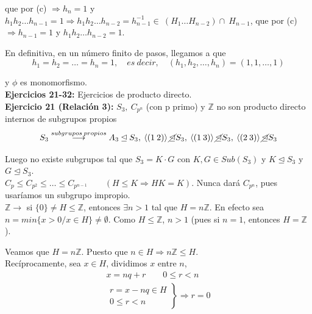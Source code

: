 \documentclass{article}
\begin{document}
que por (c) $\Rightarrow h_n=1$ y $h_1h_2\ldots h_{n-1}=1\Rightarrow h_1h_2\ldots h_{n-2}=h_{n-1}^{-1}\in~(H_1\ldots H_{n-2})\cap~H_{n-1}$, que por (c) $\Rightarrow h_{n-1}=1$ y $h_1h_2\ldots h_{n-2}=1$. 

En definitiva, en un número finito de pasos, llegamos a que 
\begin{equation*}
h_1=h_2=\ldots=h_n=1,\quad es\:decir,\quad(h_1,h_2,\ldots,h_n)=(1,1,\ldots,1)
\end{equation*}

y $\phi$ es monomorfismo. \\

\textbf{Ejercicios 21-32:} Ejercicios de producto directo. \\

\textbf{Ejercicio 21 (Relación 3):} $S_3,\:C_{p^n}$ (con p primo) y $\mathbb{Z}$ no son producto directo internos de subgrupos propios
\begin{equation*}
S_3\overset{subgrupos\:propios}{\longrightarrow} A_3\unlhd S_3,\:\left\langle (1\:2)\right\rangle \cancel{\unlhd}S_3,\:\left\langle(1\:3)\right\rangle \cancel{\unlhd} S_3,\:\left\langle (2\:3)\right\rangle \cancel{\unlhd} S_3
\end{equation*}

Luego no existe subgrupos tal que $S_3=K\cdot G$ con $K,G\in Sub(S_3)$ y $K\unlhd S_3$ y $G\unlhd S_3$. \\

$C_p\leq C_{p^2}\leq \ldots \leq C_{p^{n-1}} \qquad (H\leq K\Rightarrow HK=K)$. Nunca dará $C_{p^n}$, pues usaríamos un subgrupo impropio. \\

$\mathbb{Z}\longrightarrow$ si $\{0\}\neq H\leq \mathbb{Z}$, entonces $\exists n>1$ tal que $H=n\mathbb{Z}$. En efecto sea $n=min\{x>0/x\in H\}\neq \emptyset$. Como $H\leq \mathbb{Z}$, $n>1$ (pues si $n=1$, entonces $H=\mathbb{Z}$).

Veamos que $H=n\mathbb{Z}$. Puesto que $n\in H\Rightarrow n\mathbb{Z}\leq H$. \\

Recíprocamente, sea $x\in H$, dividimos $x$ entre $n$,
\begin{gather*}
x=nq+r\qquad 0\leq r<n \\
\left. \begin{array}{c}
r=x-nq\in H \\
0\leq r<n
\end{array}\right\rbrace \Rightarrow r=0
\end{gather*}
\end{document}
